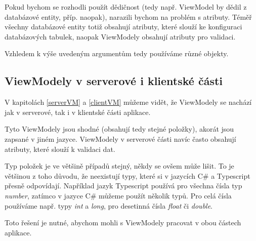 Pokud bychom se rozhodli použít dědičnost (tedy např. ViewModel by dědil z databázové entity, příp. naopak), narazili bychom na problém s atributy.
Téměř všechny databázové entity totiž obsahují atributy, které slouží ke konfiguraci databázových tabulek, naopak ViewModely obsahují atributy pro validaci. 

Vzhledem k výše uvedeným argumentům tedy používáme různé objekty.


\subsection{ViewModely v serverové i klientské části}

V kapitolách \ref{serverVM} a \ref{clientVM} můžeme vidět, že ViewModely se nachází jak v serverové, tak i v klientské části aplikace. 

Tyto ViewModely jsou shodné (obsahují tedy stejné položky), akorát jsou zapsané v jiném jazyce. ViewModely v serverové části navíc často obsahují atributy, které slouží k validaci dat.

Typ položek je ve většině případů stejný, někdy se ovšem může lišit. To je většinou z toho důvodu, že neexistují typy, které si v jazycích C\# a Typescript přesně odpovídají.
Například jazyk Typescript používá pro všechna čísla typ \textit{number}, zatímco v jazyce C\# můžeme použít několik typů. 
Pro celá čísla používáme např. typy \textit{int} a \textit{long}, pro desetinná čísla \textit{float} či \textit{double}.

Toto řešení je nutné, abychom mohli s ViewModely pracovat v obou částech aplikace.